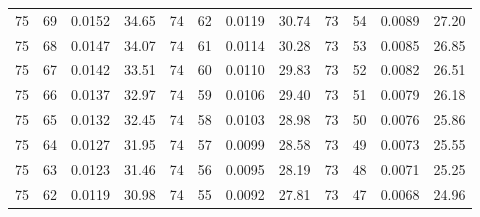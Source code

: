 \begin{tabular}{llll|llll|llll}
75 & 69 & 0.0152 & 34.65 & 74 & 62 & 0.0119 & 30.74 & 73 & 54 & 0.0089 & 27.20\\
75 & 68 & 0.0147 & 34.07 & 74 & 61 & 0.0114 & 30.28 & 73 & 53 & 0.0085 & 26.85\\
75 & 67 & 0.0142 & 33.51 & 74 & 60 & 0.0110 & 29.83 & 73 & 52 & 0.0082 & 26.51\\
75 & 66 & 0.0137 & 32.97 & 74 & 59 & 0.0106 & 29.40 & 73 & 51 & 0.0079 & 26.18\\
75 & 65 & 0.0132 & 32.45 & 74 & 58 & 0.0103 & 28.98 & 73 & 50 & 0.0076 & 25.86\\
75 & 64 & 0.0127 & 31.95 & 74 & 57 & 0.0099 & 28.58 & 73 & 49 & 0.0073 & 25.55\\
75 & 63 & 0.0123 & 31.46 & 74 & 56 & 0.0095 & 28.19 & 73 & 48 & 0.0071 & 25.25\\
75 & 62 & 0.0119 & 30.98 & 74 & 55 & 0.0092 & 27.81 & 73 & 47 & 0.0068 & 24.96\\
\bottomrule
\end{tabular}
\newpage
